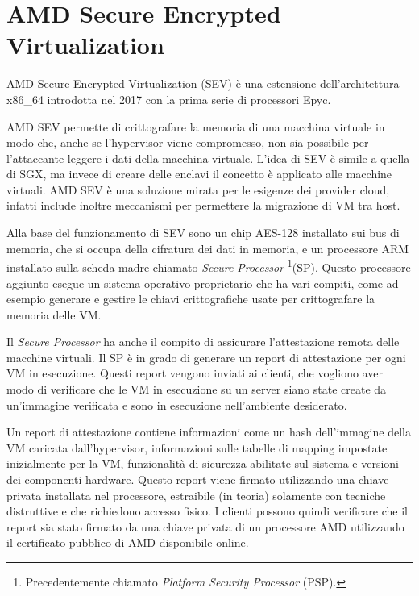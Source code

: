 \documentclass[12pt,italian]{report}
\begin{document}
\section{AMD Secure Encrypted Virtualization}
\label{sec:amd-sev}
AMD Secure Encrypted Virtualization (SEV) è una estensione dell'architettura
x86\_64 introdotta nel 2017\cite{sev} con la prima serie
di processori Epyc.

AMD SEV permette di crittografare la memoria di una macchina virtuale in
modo che, anche se l'hypervisor viene compromesso, non sia possibile per
l'attaccante leggere i dati della macchina virtuale.
L'idea di SEV è simile a quella di SGX, ma invece di creare delle enclavi
il concetto è applicato alle macchine virtuali.
AMD SEV è una soluzione mirata per le esigenze dei provider cloud,
infatti include inoltre meccanismi per permettere la migrazione di VM
tra host.

Alla base del funzionamento di SEV sono un chip AES-128 installato sui
bus di memoria, che si occupa della cifratura dei dati in memoria,
e un processore ARM installato sulla scheda madre chiamato 
\textit{Secure Processor}
\footnote{
    Precedentemente chiamato \textit{Platform Security Processor} (PSP).
}(SP).
Questo processore aggiunto esegue un sistema operativo proprietario che
ha vari compiti, come ad esempio generare e gestire le chiavi crittografiche
usate per crittografare la memoria delle VM.

Il \textit{Secure Processor} ha anche il compito di assicurare
l'attestazione remota delle macchine virtuali.
Il SP è in grado di generare un report di attestazione per ogni VM
in esecuzione.
Questi report vengono inviati ai clienti, che vogliono aver modo di
verificare che le VM in esecuzione su un server siano state create
da un'immagine verificata e sono in esecuzione nell'ambiente desiderato.

Un report di attestazione contiene informazioni come un hash dell'immagine
della VM caricata dall'hypervisor, informazioni sulle tabelle di mapping
impostate inizialmente per la VM, funzionalità di sicurezza abilitate
sul sistema e versioni dei componenti hardware.
Questo report viene firmato utilizzando una chiave privata installata nel
processore, estraibile (in teoria) solamente con tecniche distruttive e
che richiedono accesso fisico.
I clienti possono quindi verificare che il report sia stato firmato da
una chiave privata di un processore AMD utilizzando il certificato pubblico
di AMD disponibile online. 

\medbreak
\end{document}
